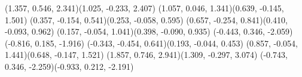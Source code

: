 \pstThreeDLine[linecolor=gray](1.357, 0.546, 2.341)(1.025, -0.233, 2.407)
\pstThreeDLine[linecolor=gray](1.057, 0.046, 1.341)(0.639, -0.145, 1.501)
\pstThreeDLine[linecolor=gray](0.357, -0.154, 0.541)(0.253, -0.058, 0.595)
\pstThreeDLine[linecolor=gray](0.657, -0.254, 0.841)(0.410, -0.093, 0.962)
\pstThreeDLine[linecolor=gray](0.157, -0.054, 1.041)(0.398, -0.090, 0.935)
\pstThreeDLine[linecolor=gray](-0.443, 0.346, -2.059)(-0.816, 0.185, -1.916)
\pstThreeDLine[linecolor=gray](-0.343, -0.454, 0.641)(0.193, -0.044, 0.453)
\pstThreeDLine[linecolor=gray](0.857, -0.054, 1.441)(0.648, -0.147, 1.521)
\pstThreeDLine[linecolor=gray](1.857, 0.746, 2.941)(1.309, -0.297, 3.074)
\pstThreeDLine[linecolor=gray](-0.743, 0.346, -2.259)(-0.933, 0.212, -2.191)
